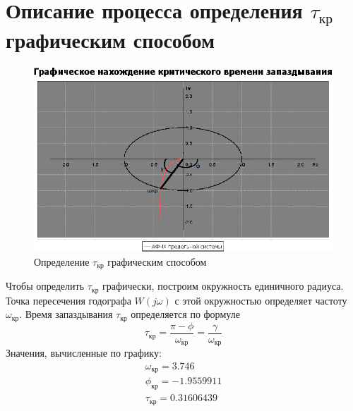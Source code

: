 \documentclass[12pt]{article}
\begin{document}
\section{Описание процесса определения $\tau_{кр}$ графическим способом}
\begin{figure}[h]
     \centering
    \includegraphics[width = \linewidth]{графически.png}
    \caption{Определение $\tau_{кр}$ графическим способом}
\end{figure} 
Чтобы определить $\tau_{кр}$ графически, построим окружность единичного радиуса. Точка пересечения годографа $W(j\omega)$ с этой окружностью определяет частоту $\omega_{кр}$. Время запаздывания $\tau_{кр}$ определяется по формуле
\begin{equation}
    \tau_{кр} = \frac{\pi - \phi}{\omega_{кр}} = \frac{\gamma}{\omega_{кр}}
\end{equation}
Значения, вычисленные по графику: 
\begin{equation}
    \begin{gathered}
    \omega_{кр} = 3.746 \\
    \phi_{кр} = -1.9559911 \\
    \tau_{кр} = 0.31606439
    \end{gathered}
\end{equation}
\newpage
\end{document}
